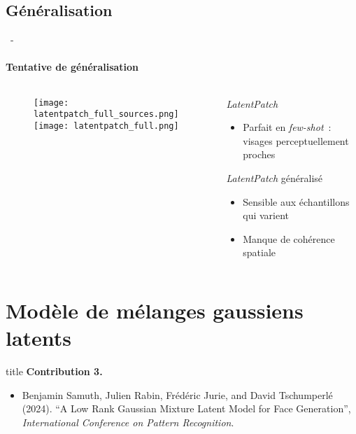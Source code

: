 \documentclass[aspectratio=169, 22pt]{beamer}
\begin{document}
\subsection{Généralisation}
\begin{frame}{\secname~- \subsecname}
  \framesubtitle{Tentative de généralisation}
  \begin{columns}
    \begin{column}{0.5\linewidth}
      \begin{figure}
        \centering
        \texttt{[image: latentpatch\_full\_sources.png]}
        \texttt{[image: latentpatch\_full.png]}
      \end{figure}
    \end{column}
    \begin{column}{0.5\linewidth}
      \begin{exampleblock}{\emph{LatentPatch}}
        \begin{itemize}
        \item Parfait en \emph{few-shot} : visages perceptuellement proches
        \end{itemize}
      \end{exampleblock}
      \begin{alertblock}{\emph{LatentPatch} généralisé}
        \begin{itemize}
        \item Sensible aux échantillons qui varient
        \item Manque de cohérence spatiale
        \end{itemize}
      \end{alertblock}
    \end{column}
  \end{columns}
\end{frame}

\section{Modèle de mélanges gaussiens latents}

\begin{frame}
  \vfill
  \begin{beamercolorbox}[sep=15pt,center,shadow=true,rounded=true]{title}
    \LARGE\bfseries Contribution 3. \\ \secname
  \end{beamercolorbox}
  \vfill
  \begin{itemize}
    \item \footnotesize Benjamin Samuth, Julien Rabin, Frédéric Jurie, and David
      Tschumperlé (2024). ``A Low Rank Gaussian Mixture Latent Model for
      Face Generation'', \emph{International Conference on Pattern
        Recognition}.
  \end{itemize}
\end{frame}
\end{document}
